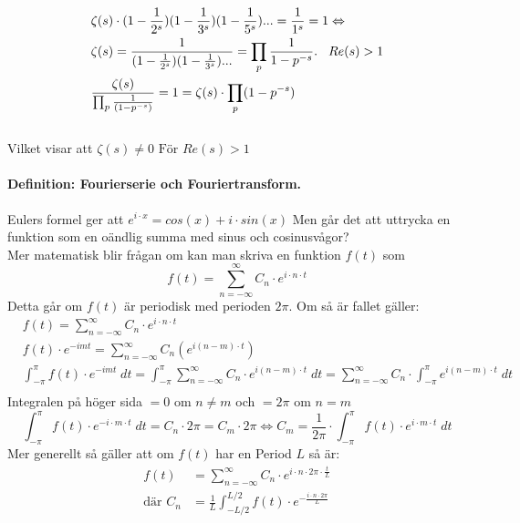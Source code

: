 \documentclass{article}%
\def \width {3mm}
\begin{document}
\begin{equation}
	\begin{aligned}
		\notag
		&\zeta(s) \cdot (1 - \frac 1 {2^s})(1 - \frac 1 {3^s})(1 - \frac 1 {5^s}) ... = \frac 1 {1^s} = 1 \Leftrightarrow \\  
		&\zeta(s)  = \frac 1 {(1 - \frac 1 {2^s})(1 - \frac 1 {3^s})...} = \prod_p \frac 1 {1 - p^{-s}}.\hspace{\width} Re(s) > 1 \\
		&\frac {\zeta(s)} {\prod_p \frac 1 {(1 - p^{-s})}} = 1 = \zeta(s) \cdot \prod_p (1 - p^{-s}) \\
	\end{aligned}
\end{equation}
\\
Vilket visar att $\zeta(s) \ne 0 \text{ För } Re(s) > 1$

\pagebreak
\paragraph{Definition: Fourierserie och Fouriertransform.\\}
Eulers formel ger att $e^{i \cdot x} = cos(x) + i \cdot sin(x)$ Men går det att uttrycka en funktion som en oändlig summa
med sinus och cosinusvågor?\\
Mer matematisk blir frågan om kan man skriva en funktion $f(t)$ som 
$$f(t) = \sum_{n = - \infty}^\infty C_n \cdot e^{i \cdot n \cdot t}$$%
Detta går om $f(t)$ är periodisk med perioden $2 \pi$. Om så är fallet gäller:
\begin{align*}
	&f(t) = \sum_{n = - \infty}^\infty C_n \cdot e^{i \cdot n \cdot t} \\
	&f(t) \cdot e^{-imt} = \sum_{n = - \infty}^\infty C_n(e^{i(n - m) \cdot t}) \\
	&\int_{-\pi}^\pi f(t) \cdot e^{-imt}\; dt= \int_{-\pi}^\pi \sum_{n = - \infty}^\infty C_n \cdot e^{i(n - m) \cdot t}\; dt=
	\sum_{n = - \infty}^\infty C_n \cdot \int_{-\pi}^\pi e^{i (n - m) \cdot t}\; dt\\
\end{align*}
Integralen på höger sida $= 0 $ om $n \ne m$ och $= 2\pi $ om $n = m$
$$\int_{-\pi}^\pi f(t) \cdot e^{-i \cdot m \cdot t}\; dt= C_n \cdot 2\pi = C_m \cdot 2\pi \Leftrightarrow C_m = \frac 1 {2\pi} \cdot
\int_{-\pi}^\pi f(t) \cdot e^{i \cdot m \cdot t}\; dt$$
Mer generellt så gäller att om $f(t)$ har en Period $L$ så är:
\begin{align*}
	f(t) &= \sum_{n = - \infty}^\infty C_n \cdot e^{i \cdot n \cdot 2\pi \cdot \frac t L} \\ %
	\text{där } C_n &= \frac 1 L \int_{- L / 2}^{L / 2} f(t) \cdot e^{- \frac {i \cdot n \cdot 2\pi} {L}}
\end{align*} %
\end{document}
